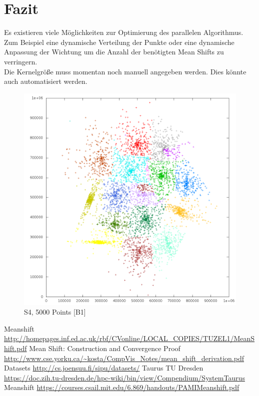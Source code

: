 \section{Fazit}
	Es existieren viele Möglichkeiten zur Optimierung des parallelen Algorithmus. Zum Beispiel eine dynamische Verteilung der Punkte oder eine dynamische Anpassung
	der Wichtung um die Anzahl der benötigten Mean Shifts zu verringern.\\
	Die Kernelgröße muss momentan noch manuell angegeben werden. Dies könnte auch automatisiert werden.\\
	\begin{figure}[H]
		\centering
		\includegraphics[scale=0.6]{../meanshift/output/pics/s4_colored.png} 
		\caption{S4, 5000 Points [B1]}
	\end{figure}
\begin{thebibliography}{999}
	\bibitem [0] {} Meanshift \url{http://homepages.inf.ed.ac.uk/rbf/CVonline/LOCAL_COPIES/TUZEL1/MeanShift.pdf}
	\bibitem [1] {} Mean Shift: Construction and Convergence Proof \url{http://www.cse.yorku.ca/~kosta/CompVis_Notes/mean_shift_derivation.pdf}
	\bibitem [2] {} Datasets \url{http://cs.joensuu.fi/sipu/datasets/}
	\bibitem [3] {} Taurus TU Dresden \url{https://doc.zih.tu-dresden.de/hpc-wiki/bin/view/Compendium/SystemTaurus}
	\bibitem [4] {} Meanshift \url{https://courses.csail.mit.edu/6.869/handouts/PAMIMeanshift.pdf}
	\newline
\end{thebibliography}
